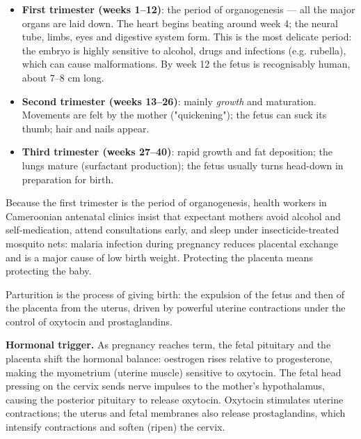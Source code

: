 \documentclass[11pt]{article}
\newcommand{\cle}[1]{{\popxbold\color{popdark}#1}}
\newcounter{popsec}
\newcounter{popsub}
\newcommand{\courssub}[1]{%
  \stepcounter{popsub}%
  \par\vspace{9pt}\noindent{\popxbold\fontsize{11.5}{13}\selectfont\color{popink}{\color{poporange}\thepopsec.\thepopsub}\hspace{6pt}#1}\par\nopagebreak\vspace{4pt}
}
\begin{document}
\begin{itemize}
\item \textbf{First trimester (weeks 1–12)}: the period of \cle{organogenesis} — all the major organs are laid down. The heart begins beating around week 4; the neural tube, limbs, eyes and digestive system form. This is the most delicate period: the embryo is highly sensitive to alcohol, drugs and infections (e.g. rubella), which can cause malformations. By week 12 the fetus is recognisably human, about 7–8 cm long.
\item \textbf{Second trimester (weeks 13–26)}: mainly \emph{growth} and maturation. Movements are felt by the mother ("quickening"); the fetus can suck its thumb; hair and nails appear.
\item \textbf{Third trimester (weeks 27–40)}: rapid growth and fat deposition; the lungs mature (surfactant production); the fetus usually turns head-down in preparation for birth.
\end{itemize}

\begin{savaistu}
Because the first trimester is the period of organogenesis, health workers in Cameroonian antenatal clinics insist that expectant mothers avoid alcohol and self-medication, attend consultations early, and sleep under insecticide-treated mosquito nets: malaria infection during pregnancy reduces placental exchange and is a major cause of low birth weight. Protecting the placenta means protecting the baby.
\end{savaistu}

\courssub{Birth (Parturition)}

\begin{definition}[Parturition]
\cle{Parturition} is the process of giving birth: the expulsion of the fetus and then of the placenta from the uterus, driven by powerful uterine contractions under the control of \cle{oxytocin} and \cle{prostaglandins}.
\end{definition}

\textbf{Hormonal trigger.} As pregnancy reaches term, the fetal pituitary and the placenta shift the hormonal balance: oestrogen rises relative to progesterone, making the myometrium (uterine muscle) sensitive to oxytocin. The fetal head pressing on the cervix sends nerve impulses to the mother's hypothalamus, causing the posterior pituitary to release \cle{oxytocin}. Oxytocin stimulates uterine contractions; the uterus and fetal membranes also release \cle{prostaglandins}, which intensify contractions and soften (ripen) the cervix.
\end{document}
